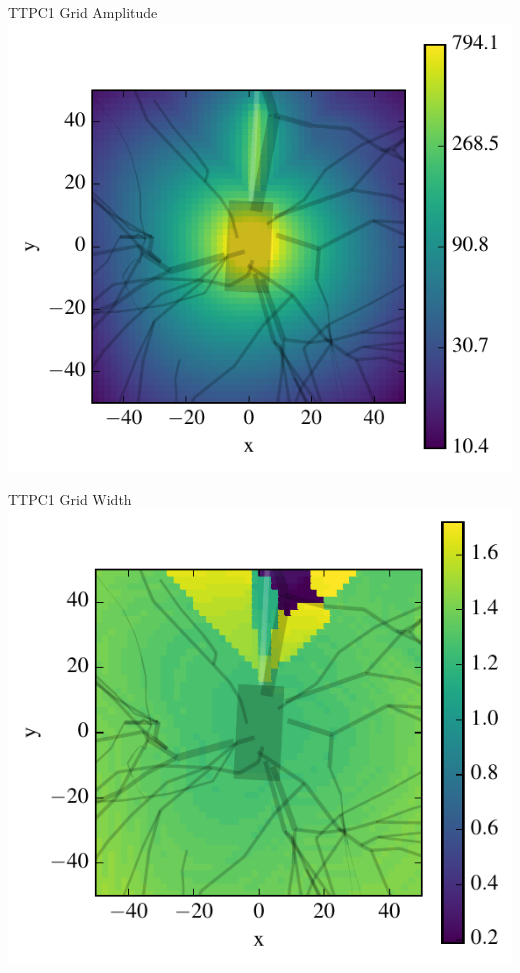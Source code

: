\documentclass{beamer}
\begin{document}
\begin{frame}{TTPC1 Grid Amplitude}{}
    \centering
    \includegraphics[width=.8\textwidth]{images/ttpc1_grid_dense_gradient.pdf}
\end{frame}

\begin{frame}{TTPC1 Grid Width}{}
    \centering
    \includegraphics[width=.8\textwidth]{images/ttpc1_grid_dense_width.pdf}
\end{frame}
\end{document}
